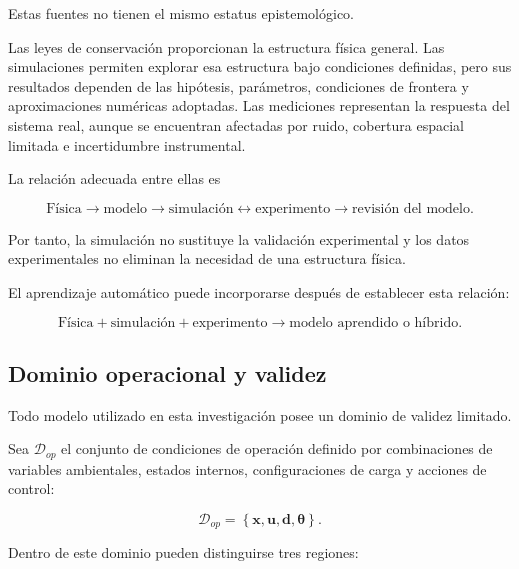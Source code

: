 Estas fuentes no tienen el mismo estatus epistemológico.

Las leyes de conservación proporcionan la estructura física general. Las simulaciones permiten explorar esa estructura bajo condiciones definidas, pero sus resultados dependen de las hipótesis, parámetros, condiciones de frontera y aproximaciones numéricas adoptadas. Las mediciones representan la respuesta del sistema real, aunque se encuentran afectadas por ruido, cobertura espacial limitada e incertidumbre instrumental.

La relación adecuada entre ellas es

\begin{equation}
\boxed{
\text{Física}
\longrightarrow
\text{modelo}
\longrightarrow
\text{simulación}
\longleftrightarrow
\text{experimento}
\longrightarrow
\text{revisión del modelo}.
}
\label{eq:ciclo_validacion}
\end{equation}

Por tanto, la simulación no sustituye la validación experimental y los datos experimentales no eliminan la necesidad de una estructura física.

El aprendizaje automático puede incorporarse después de establecer esta relación:

\begin{equation}
\boxed{
\text{Física}
+
\text{simulación}
+
\text{experimento}
\longrightarrow
\text{modelo aprendido o híbrido}.
}
\label{eq:fuentes_modelo_hibrido}
\end{equation}

\subsection{Dominio operacional y validez}
\label{subsec:dominio_operacional_validez}

Todo modelo utilizado en esta investigación posee un dominio de validez limitado.

Sea $\mathcal{D}_{op}$ el conjunto de condiciones de operación definido por combinaciones de variables ambientales, estados internos, configuraciones de carga y acciones de control:

\begin{equation}
\mathcal{D}_{op}
=
\left\{
\mathbf{x},
\mathbf{u},
\mathbf{d},
\boldsymbol{\theta}
\right\}.
\end{equation}

Dentro de este dominio pueden distinguirse tres regiones:

